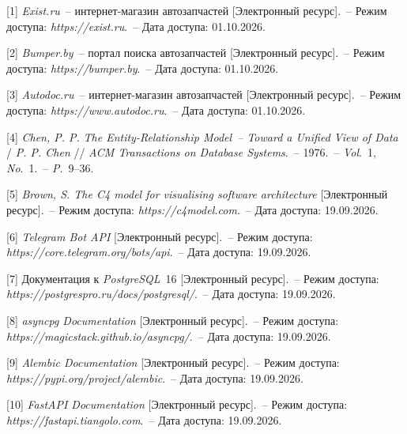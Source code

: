 \renewcommand{\bibsection}{\sectioncentered*{Список использованных источников}}
\pagebreak %


[1] \textit{Exist.ru}~-- интернет-магазин автозапчастей [Электронный ресурс].~-- Режим доступа: \textit{https://exist.\allowbreak ru}.~-- Дата доступа: 01.10.2026.

[2] \textit{Bumper.by}~-- портал поиска автозапчастей [Электронный ресурс].~-- Режим доступа: \textit{https://bumper.\allowbreak by}.~-- Дата доступа: 01.10.2026.

[3] \textit{Autodoc.ru}~-- интернет-магазин автозапчастей [Электронный ресурс].~-- Режим доступа: \textit{https://www.\allowbreak autodoc.\allowbreak ru}.~-- Дата доступа: 01.10.2026.

[4] \textit{Chen, P. P.} \textit{The Entity-Relationship Model~-- Toward a Unified View of Data} / \textit{P. P. Chen} // \textit{ACM Transactions on Database Systems}.~-- 1976.~-- \textit{Vol}.~1, \textit{No}.~1.~-- \textit{P}.~9--36.

[5] \textit{Brown, S. The C4 model for visualising software architecture} [Электронный ресурс].~-- Режим доступа: \textit{https://c4model.\allowbreak com}.~-- Дата доступа: 19.09.2026.

[6] \textit{Telegram Bot API} [Электронный ресурс].~-- Режим доступа: \textit{https://core.\allowbreak telegram.\allowbreak org/\allowbreak bots/\allowbreak api}.~-- Дата доступа: 19.09.2026.

[7] Документация к \textit{PostgreSQL}~16 [Электронный ресурс].~-- Режим доступа: \textit{https://postgrespro.\allowbreak ru/\allowbreak docs/\allowbreak postgresql/}.~-- Дата доступа: 19.09.2026.

[8] \textit{asyncpg Documentation} [Электронный ресурс].~-- Режим доступа: \textit{https://magicstack.\allowbreak github.\allowbreak io/\allowbreak asyncpg/}.~-- Дата доступа: 19.09.2026.

[9] \textit{Alembic Documentation} [Электронный ресурс].~-- Режим доступа: \textit{https://pypi.\allowbreak org/\allowbreak project/\allowbreak alembic}.~-- Дата доступа: 19.09.2026.

[10] \textit{FastAPI Documentation} [Электронный ресурс].~-- Режим доступа: \textit{https://fastapi.\allowbreak tiangolo.\allowbreak com}.~-- Дата доступа: 19.09.2026.

